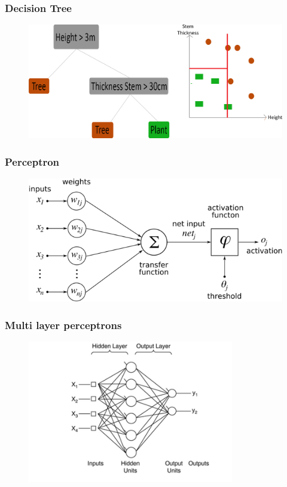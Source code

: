 \documentclass{beamer}
\begin{document}

\begin{frame} %
\frametitle{Decision Tree}
\begin{figure}
	\centering
    \includegraphics[width=\textwidth,scale=1]{./img/DTExplained.png}
\end{figure}

\end{frame}

\begin{frame} %
\frametitle{Perceptron}
\begin{figure}
	\centering
    \includegraphics[width=\textwidth]{./img/perceptron.png}
\end{figure}

\end{frame}
\begin{frame}
\frametitle{Multi layer perceptrons}
\begin{figure}
	\centering
    \includegraphics[width=90mm,scale=1]{./img/MLP.jpg}
\end{figure}
\end{frame}
\end{document}
